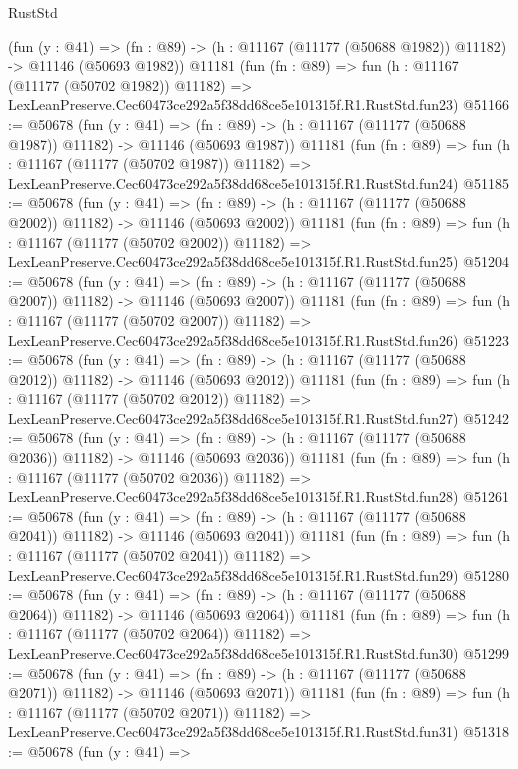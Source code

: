 \begin{lexlean}{RustStd}
\begin{coremodule}
    (fun (y : @41) =>
    (fn : @89) -> (h : @11167 (@11177 (@50688 @1982)) @11182) -> @11146 (@50693 @1982))
    @11181
    (fun (fn : @89) =>
    fun (h : @11167 (@11177 (@50702 @1982)) @11182) =>
    LexLeanPreserve.Cec60473ce292a5f38dd68ce5e101315f.R1.RustStd.fun23)
@51166 := @50678
    (fun (y : @41) =>
    (fn : @89) -> (h : @11167 (@11177 (@50688 @1987)) @11182) -> @11146 (@50693 @1987))
    @11181
    (fun (fn : @89) =>
    fun (h : @11167 (@11177 (@50702 @1987)) @11182) =>
    LexLeanPreserve.Cec60473ce292a5f38dd68ce5e101315f.R1.RustStd.fun24)
@51185 := @50678
    (fun (y : @41) =>
    (fn : @89) -> (h : @11167 (@11177 (@50688 @2002)) @11182) -> @11146 (@50693 @2002))
    @11181
    (fun (fn : @89) =>
    fun (h : @11167 (@11177 (@50702 @2002)) @11182) =>
    LexLeanPreserve.Cec60473ce292a5f38dd68ce5e101315f.R1.RustStd.fun25)
@51204 := @50678
    (fun (y : @41) =>
    (fn : @89) -> (h : @11167 (@11177 (@50688 @2007)) @11182) -> @11146 (@50693 @2007))
    @11181
    (fun (fn : @89) =>
    fun (h : @11167 (@11177 (@50702 @2007)) @11182) =>
    LexLeanPreserve.Cec60473ce292a5f38dd68ce5e101315f.R1.RustStd.fun26)
@51223 := @50678
    (fun (y : @41) =>
    (fn : @89) -> (h : @11167 (@11177 (@50688 @2012)) @11182) -> @11146 (@50693 @2012))
    @11181
    (fun (fn : @89) =>
    fun (h : @11167 (@11177 (@50702 @2012)) @11182) =>
    LexLeanPreserve.Cec60473ce292a5f38dd68ce5e101315f.R1.RustStd.fun27)
@51242 := @50678
    (fun (y : @41) =>
    (fn : @89) -> (h : @11167 (@11177 (@50688 @2036)) @11182) -> @11146 (@50693 @2036))
    @11181
    (fun (fn : @89) =>
    fun (h : @11167 (@11177 (@50702 @2036)) @11182) =>
    LexLeanPreserve.Cec60473ce292a5f38dd68ce5e101315f.R1.RustStd.fun28)
@51261 := @50678
    (fun (y : @41) =>
    (fn : @89) -> (h : @11167 (@11177 (@50688 @2041)) @11182) -> @11146 (@50693 @2041))
    @11181
    (fun (fn : @89) =>
    fun (h : @11167 (@11177 (@50702 @2041)) @11182) =>
    LexLeanPreserve.Cec60473ce292a5f38dd68ce5e101315f.R1.RustStd.fun29)
@51280 := @50678
    (fun (y : @41) =>
    (fn : @89) -> (h : @11167 (@11177 (@50688 @2064)) @11182) -> @11146 (@50693 @2064))
    @11181
    (fun (fn : @89) =>
    fun (h : @11167 (@11177 (@50702 @2064)) @11182) =>
    LexLeanPreserve.Cec60473ce292a5f38dd68ce5e101315f.R1.RustStd.fun30)
@51299 := @50678
    (fun (y : @41) =>
    (fn : @89) -> (h : @11167 (@11177 (@50688 @2071)) @11182) -> @11146 (@50693 @2071))
    @11181
    (fun (fn : @89) =>
    fun (h : @11167 (@11177 (@50702 @2071)) @11182) =>
    LexLeanPreserve.Cec60473ce292a5f38dd68ce5e101315f.R1.RustStd.fun31)
@51318 := @50678
    (fun (y : @41) =>

\end{coremodule}
\end{lexlean}
